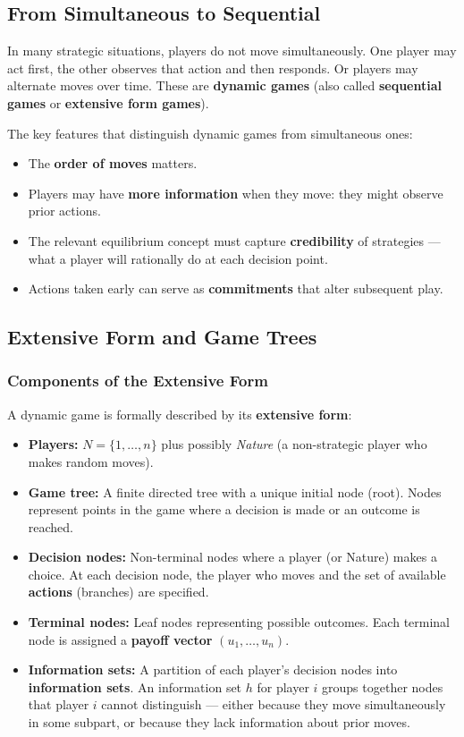 \documentclass[hidelinks]{article}
\begin{document}
\subsection{From Simultaneous to Sequential}

In many strategic situations, players do not move simultaneously. One player may act first, the other observes that action and then responds. Or players may alternate moves over time. These are \textbf{dynamic games} (also called \textbf{sequential games} or \textbf{extensive form games}).

The key features that distinguish dynamic games from simultaneous ones:
\begin{itemize}
    \item The \textbf{order of moves} matters.
    \item Players may have \textbf{more information} when they move: they might observe prior actions.
    \item The relevant equilibrium concept must capture \textbf{credibility} of strategies — what a player will rationally do at each decision point.
    \item Actions taken early can serve as \textbf{commitments} that alter subsequent play.
\end{itemize}

\subsection{Extensive Form and Game Trees}

\subsubsection{Components of the Extensive Form}

A dynamic game is formally described by its \textbf{extensive form}:

\begin{itemize}
    \item \textbf{Players:} $N = \{1, \ldots, n\}$ plus possibly \textit{Nature} (a non-strategic player who makes random moves).
    \item \textbf{Game tree:} A finite directed tree with a unique initial node (root). Nodes represent points in the game where a decision is made or an outcome is reached.
    \item \textbf{Decision nodes:} Non-terminal nodes where a player (or Nature) makes a choice. At each decision node, the player who moves and the set of available \textbf{actions} (branches) are specified.
    \item \textbf{Terminal nodes:} Leaf nodes representing possible outcomes. Each terminal node is assigned a \textbf{payoff vector} $(u_1, \ldots, u_n)$.
    \item \textbf{Information sets:} A partition of each player's decision nodes into \textbf{information sets}. An information set $h$ for player $i$ groups together nodes that player $i$ cannot distinguish — either because they move simultaneously in some subpart, or because they lack information about prior moves.
\end{itemize}
\end{document}
